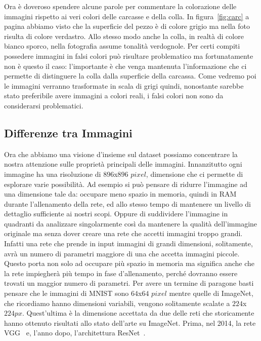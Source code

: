 Ora è doveroso spendere alcune parole per commentare la colorazione delle immagini rispetto ai veri colori delle carcasse e della colla.
In figura~\ref{fig:carc} a pagina \pageref{fig:carc} abbiamo visto che la superficie del pezzo è di colore grigio ma nella foto risulta di colore verdastro.
Allo stesso modo anche la colla, in realtà di colore bianco sporco, nella fotografia assume tonalità verdognole.
Per certi compiti possedere immagini in falsi colori può risultare problematico ma fortunatamente non è questo il caso: l'importante è che venga mantenuta l'informazione che ci permette di distinguere la colla dalla superficie della carcassa.
Come vedremo poi le immagini verranno trasformate in scala di grigi quindi, nonostante sarebbe stato preferibile avere immagini a colori reali, i falsi colori non sono da considerarsi problematici.

\subsection{Differenze tra Immagini}
Ora che abbiamo una visione d'insieme sul dataset possiamo concentrare la nostra attenzione sulle proprietà principali delle immagini.
Innanzitutto ogni immagine ha una risoluzione di $896$x$896$ $pixel$, dimensione che ci permette di esplorare varie possibilità.
Ad esempio si può pensare di ridurre l'immagine ad una dimensione tale da: occupare meno spazio in memoria, quindi in RAM durante l'allenamento della rete, ed allo stesso tempo di mantenere un livello di dettaglio sufficiente ai nostri scopi.
Oppure di suddividere l'immagine in quadranti da analizzare singolarmente così da mantenere la qualità dell'immagine originale ma senza dover creare una rete che accetti immagini troppo grandi.
Infatti una rete che prende in input immagini di grandi dimensioni, solitamente, avrà un numero di parametri maggiore di una che accetta immagini piccole.
Questo porta non solo ad occupare più spazio in memoria ma significa anche che la rete impiegherà più tempo in fase d'allenamento, perché dovranno essere trovati un maggior numero di parametri.
Per avere un termine di paragone basti pensare che le immagini di MNIST sono $64$x$64$ $pixel$ mentre quelle di ImageNet, che ricordiamo hanno dimensioni variabili, vengono solitamente scalate a $224$x$224px$.
Quest'ultima è la dimensione accettata da due delle reti che storicamente hanno ottenuto risultati allo stato dell'arte su ImageNet.
Prima, nel 2014, la rete VGG~\cite{vgg} e, l'anno dopo, l'architettura ResNet~\cite{resnet}.

